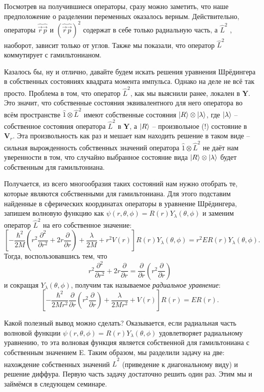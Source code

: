 Посмотрев на получившиеся операторы, сразу можно заметить, что наше предположение о разделении переменных оказалось верным. Действительно, операторы $\hat{\Vec{r}}\hat{\Vec{p}}$ и $(\hat{\Vec{r}}\hat{\Vec{p}})^2$ содержат в себе только радиальную часть, а $\hat{L}^2$ , наоборот, зависит только от углов. Также мы показали, что оператор $\hat{L}^2$ коммутирует с гамильтонианом. 

Казалось бы, ну и отлично, давайте будем искать решения уравнения Шрёдингера в собственных состояниях квадрата момента импульса. Однако на деле не всё так просто. Проблема в том, что оператор $\hat{L}^2$, как мы выяснили ранее, локален в $\mathbf{Y}$. Это значит, что собственные состояния эквивалентного для него оператора во всём пространстве $\hat{1}\otimes\hat{L}^2$ имеют собственные состояния $\ket{R}\otimes\ket{\lambda}$, где $\ket{\lambda}$ -- собственное состояния оператора $\hat{L}^2$ в $\mathbf{Y}$, а $\ket{R}$ -- произвольное (!) состояние в $\mathbf{V}_r$. Эта произвольность как раз и мешает нам находить решение в таком виде -- сильная вырожденность собственных значений оператора $\hat{1}\otimes\hat{L}^2$ не даёт нам уверенности в том, что случайно выбранное состояние вида $\ket{R}\otimes\ket{\lambda}$ будет собственным для гамильтониана. 

Получается, из всего многообразия таких состояний нам нужно отобрать те, которые являются собственными для гамильтониана. Для этого подставим найденные в сферических координатах операторы в уравнение Шрёдингера, запишем волновую функцию как $\psi(r, \theta, \phi) = R(r)Y_{\lambda}(\theta, \phi)$ и заменим оператор $\hat{L}^2$ на его собственное значение: 
\[
\left[-\frac{\hbar^2}{2M}\left( r^2\frac{\partial^2}{\partial r^2} + 2r\frac{\partial}{\partial r} \right)  + \frac{\lambda}{2M} + r^2V(r)\right]R(r)Y_{\lambda}(\theta, \phi) = r^2ER(r)Y_{\lambda}(\theta, \phi).
\]
Тогда, воспользовавшись тем, что 
\[
r^2\frac{\partial^2}{\partial r^2} + 2r\frac{\partial}{\partial r} = \frac{\partial}{\partial r}\left( r^2 \frac{\partial}{\partial r}\right)
\]
и сокращая $Y_{\lambda}(\theta, \phi)$, получим так называемое \textit{радиальное уравнение}:
\[
\left[-\frac{\hbar^2}{2Mr^2}\frac{\partial}{\partial r}\left( r^2 \frac{\partial}{\partial r}\right)  + \frac{\lambda}{2Mr^2} + V(r)\right]R(r) = ER(r).
\]

Какой полезный вывод можно сделать? Оказывается, если радиальная часть волновой функции $\psi(r, \theta, \phi) = R(r)Y_{\lambda}(\theta, \phi)$ удовлетворяет радиальному уравнению, то эта волновая функция является собственной для гамильтониана с собственным значением E. Таким образом, мы разделили задачу на две: нахождение собственных значений $\hat{L}^2$ (приведение к диагональному виду) и решение диффура. Первую часть задачу достаточно решить один раз. Этим мы и займёмся в следующем семинаре.